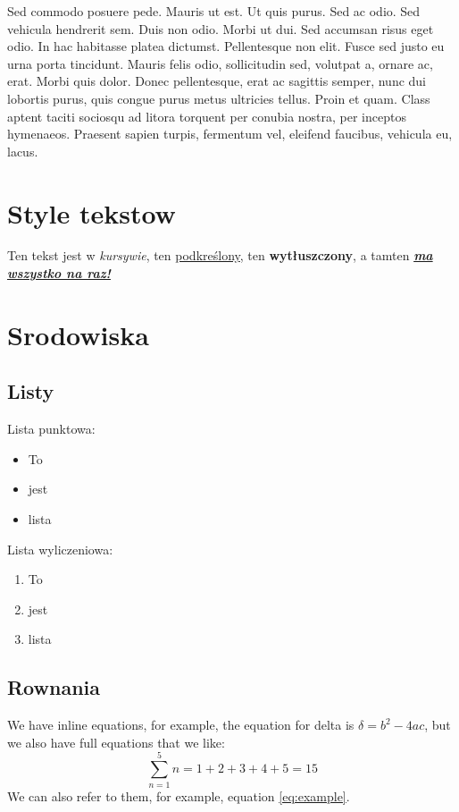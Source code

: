 \documentclass{article}
\begin{document}
Sed commodo posuere pede. Mauris ut est. Ut quis purus. Sed ac odio. Sed vehicula hendrerit sem. Duis non odio. Morbi ut dui. Sed accumsan risus eget odio. In hac habitasse platea dictumst. Pellentesque non elit. Fusce sed justo eu urna porta tincidunt. Mauris felis odio, sollicitudin sed, volutpat a, ornare ac, erat. Morbi quis dolor. Donec pellentesque, erat ac sagittis semper, nunc dui lobortis purus, quis congue purus metus ultricies tellus. Proin et quam. Class aptent taciti sociosqu ad litora torquent per conubia nostra, per inceptos hymenaeos. Praesent sapien turpis, fermentum vel, eleifend faucibus, vehicula eu, lacus.


\section{Style tekstow}
Ten tekst jest w \textit{kursywie}, ten \underline{podkreślony}, ten \textbf{wytłuszczony}, a tamten
\textbf{\textit{\underline{ma wszystko na raz!}}}
\section{Srodowiska}
    \subsection{Listy}
Lista punktowa: 
    \begin{itemize}
    \item To
    \item jest
    \item lista
\end{itemize}
Lista wyliczeniowa:
    \begin{enumerate}
        \item To
        \item jest
        \item lista
    \end{enumerate}


    \subsection{Rownania}

We have inline equations, for example, the equation for delta is \( \delta = b^2 - 4ac \), but we also have full equations that we like:
\begin{equation}
\sum_{n=1}^{5} n = 1 + 2 + 3 + 4 + 5 = 15 \label{eq:example}
\end{equation}
We can also refer to them, for example, equation \eqref{eq:example}.
\end{document}
